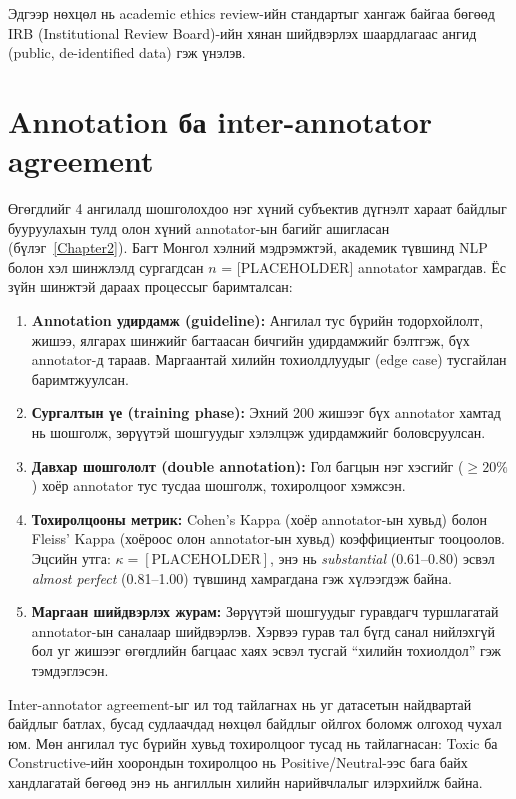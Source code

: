 Эдгээр нөхцөл нь academic ethics review-ийн стандартыг хангаж байгаа бөгөөд
IRB (Institutional Review Board)-ийн хянан шийдвэрлэх шаардлагаас ангид
(public, de-identified data) гэж үнэлэв.

\section{Annotation ба inter-annotator agreement}

Өгөгдлийг 4 ангилалд шошголохдоо нэг хүний субъектив дүгнэлт хараат байдлыг
бууруулахын тулд олон хүний annotator-ын багийг ашигласан (бүлэг~\ref{Chapter2}).
Багт Монгол хэлний мэдрэмжтэй, академик түвшинд NLP болон хэл шинжлэлд сургагдсан
$n$ = [PLACEHOLDER] annotator хамрагдав. Ёс зүйн шинжтэй дараах процессыг
баримталсан:

\begin{enumerate}
  \item \textbf{Annotation удирдамж (guideline):} Ангилал тус бүрийн
    тодорхойлолт, жишээ, ялгарах шинжийг багтаасан бичгийн удирдамжийг
    бэлтгэж, бүх annotator-д тараав. Маргаантай хилийн тохиолдлуудыг (edge
    case) тусгайлан баримтжуулсан.
  \item \textbf{Сургалтын үе (training phase):} Эхний 200 жишээг бүх
    annotator хамтад нь шошголж, зөрүүтэй шошгуудыг хэлэлцэж удирдамжийг
    боловсруулсан.
  \item \textbf{Давхар шошгололт (double annotation):} Гол багцын нэг хэсгийг
    ($\geq\!20\%$) хоёр annotator тус тусдаа шошголж, тохиролцоог хэмжсэн.
  \item \textbf{Тохиролцооны метрик:} Cohen's Kappa (хоёр annotator-ын хувьд)
    болон Fleiss' Kappa (хоёроос олон annotator-ын хувьд) коэффициентыг
    тооцоолов. Эцсийн утга: $\kappa\!=\![\text{PLACEHOLDER}]$, энэ нь
    \textit{substantial} (0.61--0.80) эсвэл \textit{almost perfect}
    (0.81--1.00) түвшинд хамрагдана гэж хүлээгдэж байна.
  \item \textbf{Маргаан шийдвэрлэх журам:} Зөрүүтэй шошгуудыг гуравдагч
    туршлагатай annotator-ын саналаар шийдвэрлэв. Хэрвээ гурав тал бүгд
    санал нийлэхгүй бол уг жишээг өгөгдлийн багцаас хаях эсвэл тусгай
    ``хилийн тохиолдол'' гэж тэмдэглэсэн.
\end{enumerate}

Inter-annotator agreement-ыг ил тод тайлагнах нь уг датасетын найдвартай
байдлыг батлах, бусад судлаачдад нөхцөл байдлыг ойлгох боломж олгоход
чухал юм. Мөн ангилал тус бүрийн хувьд тохиролцоог тусад нь тайлагнасан:
Toxic ба Constructive-ийн хоорондын тохиролцоо нь Positive/Neutral-ээс бага
байх хандлагатай бөгөөд энэ нь ангиллын хилийн нарийвчлалыг илэрхийлж байна.

